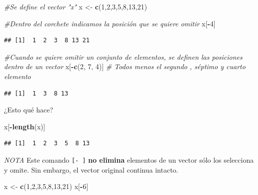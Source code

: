 \documentclass[
]{book}
\newenvironment{Shaded}{\begin{snugshade}}{\end{snugshade}}
\newcommand{\CommentTok}[1]{\textcolor[rgb]{0.56,0.35,0.01}{\textit{#1}}}
\newcommand{\DecValTok}[1]{\textcolor[rgb]{0.00,0.00,0.81}{#1}}
\newcommand{\FunctionTok}[1]{\textcolor[rgb]{0.13,0.29,0.53}{\textbf{#1}}}
\newcommand{\NormalTok}[1]{#1}
\newcommand{\OtherTok}[1]{\textcolor[rgb]{0.56,0.35,0.01}{#1}}
\newcommand{\SpecialCharTok}[1]{\textcolor[rgb]{0.81,0.36,0.00}{\textbf{#1}}}
\begin{document}
\begin{Shaded}
\begin{Highlighting}[]
\CommentTok{\#Se define el vector "x"}
\NormalTok{x }\OtherTok{\textless{}{-}} \FunctionTok{c}\NormalTok{(}\DecValTok{1}\NormalTok{,}\DecValTok{2}\NormalTok{,}\DecValTok{3}\NormalTok{,}\DecValTok{5}\NormalTok{,}\DecValTok{8}\NormalTok{,}\DecValTok{13}\NormalTok{,}\DecValTok{21}\NormalTok{)}

\CommentTok{\#Dentro del corchete indicamos la posición que se quiere omitir }
\NormalTok{x[}\SpecialCharTok{{-}}\DecValTok{4}\NormalTok{]}
\end{Highlighting}
\end{Shaded}

\begin{verbatim}
## [1]  1  2  3  8 13 21
\end{verbatim}

\begin{Shaded}
\begin{Highlighting}[]
\CommentTok{\#Cuando se quiere omitir un conjunto de elementos, se definen las posiciones dentro de un vector}
\NormalTok{x[}\SpecialCharTok{{-}}\FunctionTok{c}\NormalTok{(}\DecValTok{2}\NormalTok{, }\DecValTok{7}\NormalTok{, }\DecValTok{4}\NormalTok{)]   }\CommentTok{\# Todos menos el segundo , séptimo y cuarto elemento}
\end{Highlighting}
\end{Shaded}

\begin{verbatim}
## [1]  1  3  8 13
\end{verbatim}

¿Esto qué hace?

\begin{Shaded}
\begin{Highlighting}[]
\NormalTok{x[}\SpecialCharTok{{-}}\FunctionTok{length}\NormalTok{(x)]}
\end{Highlighting}
\end{Shaded}

\begin{verbatim}
## [1]  1  2  3  5  8 13
\end{verbatim}

\emph{NOTA} Este comando \texttt{{[}-\ {]}} \textbf{no elimina} elementos de un vector sólo los selecciona y omite. Sin embargo, el vector original continua intacto.

\begin{Shaded}
\begin{Highlighting}[]
\NormalTok{x }\OtherTok{\textless{}{-}} \FunctionTok{c}\NormalTok{(}\DecValTok{1}\NormalTok{,}\DecValTok{2}\NormalTok{,}\DecValTok{3}\NormalTok{,}\DecValTok{5}\NormalTok{,}\DecValTok{8}\NormalTok{,}\DecValTok{13}\NormalTok{,}\DecValTok{21}\NormalTok{)}
\NormalTok{x[}\SpecialCharTok{{-}}\DecValTok{6}\NormalTok{] }
\end{Highlighting}
\end{Shaded}
\end{document}
